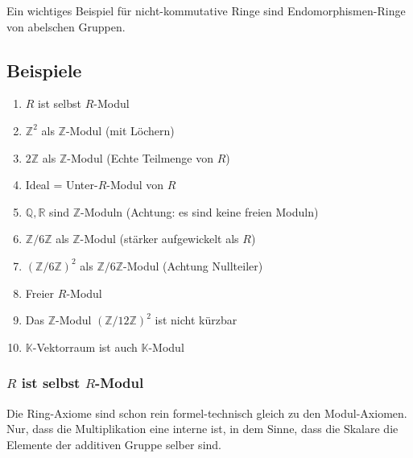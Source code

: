 \documentclass[a4paper]{amsart}
\theoremstyle{definition}
\newcommand{\R}{\ensuremath{\mathbb{ R }}}
\newcommand{\Q}{\ensuremath{\mathbb{ Q }}}
\newcommand{\Z}{\ensuremath{\mathbb{ Z }}}
\newcommand{\K}{\ensuremath{\mathbb{ K }}}
\newcommand{\zz}[1]{\ensuremath{\Z /#1\Z}}
\begin{document}
Ein wichtiges Beispiel für nicht-kommutative Ringe sind Endomorphismen-Ringe von abelschen Gruppen.

\subsection{Beispiele}
\begin{enumerate}
   \item $R$ ist selbst $R$-Modul
   \item $\Z^2$ als \Z-Modul (mit Löchern)
   \item $2\Z$ als \Z-Modul (Echte Teilmenge von $R$)
   \item Ideal = Unter-$R$-Modul von $R$
   \item $\Q, \R$ sind $\Z$-Moduln (Achtung: es sind keine freien Moduln)
   \item \zz6 als \Z-Modul (stärker aufgewickelt als $R$)
   \item $(\zz6)^2$ als \zz6-Modul (Achtung Nullteiler)
   \item Freier $R$-Modul
   \item Das \Z-Modul $(\zz{12})^2$ ist nicht kürzbar
   \item $\K$-Vektorraum ist auch $\K$-Modul
\end{enumerate}

\subsubsection{$R$ ist selbst $R$-Modul}
Die Ring-Axiome sind schon rein formel-technisch gleich zu den Modul-Axiomen. Nur, dass die Multiplikation eine interne ist, in dem Sinne, dass die Skalare die Elemente der additiven Gruppe selber sind.

\end{document}
